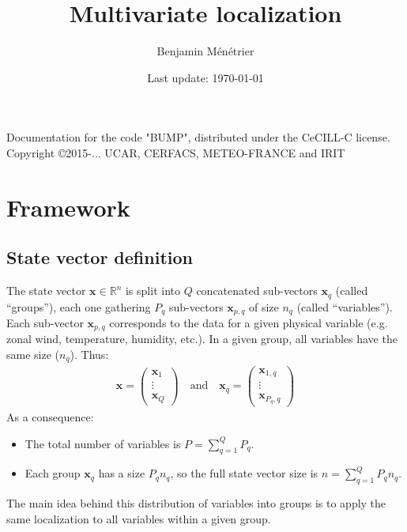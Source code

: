 \documentclass[12pt]{scrartcl}
\begin{document}
\title{Multivariate localization}
\author{Benjamin Ménétrier}
\date{Last update: \today}

\thispagestyle{empty}

\maketitle
\begin{center}
Documentation for the code "BUMP", distributed under the CeCILL-C license.\\
Copyright \copyright 2015-... UCAR, CERFACS, METEO-FRANCE and IRIT
\end{center}

\tableofcontents

\clearpage


\section{Framework}

\subsection{State vector definition}
The state vector $\mathbf{x} \in \mathbb{R}^n$ is split into $Q$ concatenated sub-vectors $\mathbf{x}_q$ (called ``groups''), each one gathering $P_q$ sub-vectors $\mathbf{x}_{p,q}$ of size $n_q$ (called ``variables''). Each sub-vector $\mathbf{x}_{p,q}$ corresponds to the data for a given physical variable (e.g. zonal wind, temperature, humidity, etc.). In a given group, all variables have the same size ($n_q$). Thus:
\begin{align}
\mathbf{x} = \left( \begin{array}{c}
\mathbf{x}_1 \\[1ex]
\hline
\vdots \\
\hline
\mathbf{x}_Q
\end{array} \right) \quad \text{and} \quad \mathbf{x}_q = \left( \begin{array}{c}
\mathbf{x}_{1,q} \\[1ex]
\hline
\vdots \\
\hline
\mathbf{x}_{P_q,q}
\end{array} \right) 
\end{align}
As a consequence:
\begin{itemize}
\item The total number of variables is $\displaystyle P = \sum_{q=1}^Q P_q$.
\item Each group $\mathbf{x}_q$ has a size $P_q n_q$, so the full state vector size is $n = \displaystyle \sum_{q=1}^Q P_q n_q$.
\end{itemize}
The main idea behind this distribution of variables into groups is to apply the same localization to all variables within a given group.\\
\end{document}
